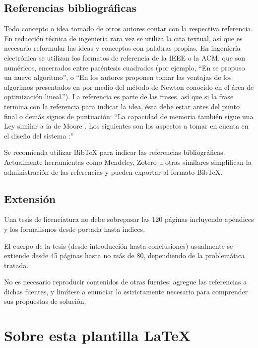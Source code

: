 \subsection{Referencias bibliográficas}

Todo concepto o idea tomado de otros autores contar con la respectiva
referencia. En redacción técnica de ingeniería rara vez se utiliza la cita
textual, así que es necesario reformular las ideas y conceptos con palabras
propias. En ingeniería electrónica se utilizan los formatos de referencia de la
IEEE o la ACM, que son numéricos, encerrados entre paréntesis cuadrados (por
ejemplo, ``En \cite{Davis1963} se propuso un nuevo algoritmo'', o ``En
\cite{ProakisManolakis1998} los autores proponen tomar las ventajas de los
algorimos presentados en \cite{Oppenheim1998,Roberts2005,Haykin2001} por medio
del método de Newton \cite{Burrus1998} conocido en el área de optimización
lineal.''). La referencia es parte de las frases, así que si la frase termina
con la referencia para indicar la idea, ésta debe estar antes del punto final o
demás signos de puntuación: ``La capacidad de memoria también sigue una Ley
similar a la de Moore \cite{Octave}. Los siguientes son los aspectos a tomar en
cuenta en el diseño del sistema \cite{Lindner2002}:''

Se recomienda utilizar BibTeX para indicar las referencias
bibliográficas.  Actualmente herramientas como Mendeley, Zotero u
otras similares simplifican la administración de las referencias y
pueden exportar al formato BibTeX.

\subsection{Extensión}

Una tesis de licenciatura no debe sobrepasar las 120 páginas incluyendo
apéndices y los formalismos desde portada hasta índices.

El cuerpo de la tesis (desde introducción hasta conclusiones) usualmente se
extiende desde 45 páginas hasta no más de 80, dependiendo de la problemática
tratada.

No es necesario reproducir contenidos de otras fuentes: agregue las referencias
a dichas fuentes, y limítese a enunciar lo estrictamente necesario para
comprender sus propuestas de solución.

\section{Sobre esta plantilla \LaTeX}

